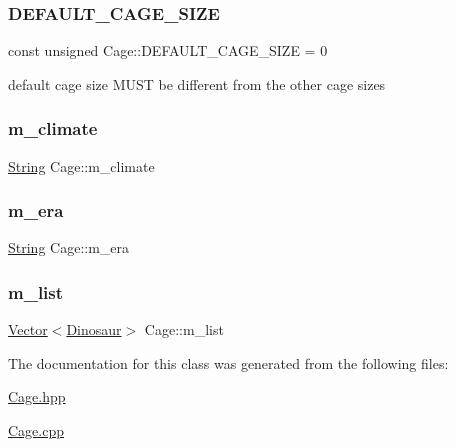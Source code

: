 \subsubsection{\texorpdfstring{D\+E\+F\+A\+U\+L\+T\+\_\+\+C\+A\+G\+E\+\_\+\+S\+I\+ZE}{DEFAULT\_CAGE\_SIZE}}
{\footnotesize\ttfamily const unsigned Cage\+::\+D\+E\+F\+A\+U\+L\+T\+\_\+\+C\+A\+G\+E\+\_\+\+S\+I\+ZE = 0\hspace{0.3cm}{\ttfamily [static]}}

default cage size M\+U\+ST be different from the other cage sizes \mbox{\label{classCage_a4c493c1794fadd15d5e972bd9094e7b6}} 
\subsubsection{\texorpdfstring{m\+\_\+climate}{m\_climate}}
{\footnotesize\ttfamily \hyperlink{classString}{String} Cage\+::m\+\_\+climate\hspace{0.3cm}{\ttfamily [private]}}

\mbox{\label{classCage_af378135c2ac9806108d09890f2c076ae}} 
\subsubsection{\texorpdfstring{m\+\_\+era}{m\_era}}
{\footnotesize\ttfamily \hyperlink{classString}{String} Cage\+::m\+\_\+era\hspace{0.3cm}{\ttfamily [private]}}

\mbox{\label{classCage_a7c2cb11aa36b13c8bc4288266ac74301}} 
\subsubsection{\texorpdfstring{m\+\_\+list}{m\_list}}
{\footnotesize\ttfamily \hyperlink{classVector}{Vector}$<$\hyperlink{classDinosaur}{Dinosaur}$>$ Cage\+::m\+\_\+list\hspace{0.3cm}{\ttfamily [private]}}



The documentation for this class was generated from the following files\+:\begin{DoxyCompactItemize}
\item 
\hyperlink{Cage_8hpp}{Cage.\+hpp}\item 
\hyperlink{Cage_8cpp}{Cage.\+cpp}\end{DoxyCompactItemize}
